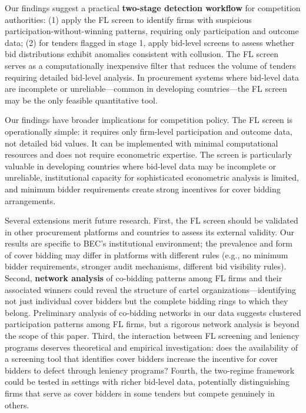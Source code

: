 Our findings suggest a practical \textbf{two-stage detection workflow} for competition authorities: (1) apply the FL screen to identify firms with suspicious participation-without-winning patterns, requiring only participation and outcome data; (2) for tenders flagged in stage 1, apply bid-level screens \citep{imhof2019detecting, chassang2022robust} to assess whether bid distributions exhibit anomalies consistent with collusion. The FL screen serves as a computationally inexpensive filter that reduces the volume of tenders requiring detailed bid-level analysis. In procurement systems where bid-level data are incomplete or unreliable---common in developing countries---the FL screen may be the only feasible quantitative tool.

Our findings have broader implications for competition policy. The FL screen is operationally simple: it requires only firm-level participation and outcome data, not detailed bid values. It can be implemented with minimal computational resources and does not require econometric expertise. The screen is particularly valuable in developing countries where bid-level data may be incomplete or unreliable, institutional capacity for sophisticated econometric analysis is limited, and minimum bidder requirements create strong incentives for cover bidding arrangements.

Several extensions merit future research. First, the FL screen should be validated in other procurement platforms and countries to assess its external validity. Our results are specific to BEC's institutional environment; the prevalence and form of cover bidding may differ in platforms with different rules (e.g., no minimum bidder requirements, stronger audit mechanisms, different bid visibility rules). Second, \textbf{network analysis} of co-bidding patterns among FL firms and their associated winners could reveal the structure of cartel organizations---identifying not just individual cover bidders but the complete bidding rings to which they belong. Preliminary analysis of co-bidding networks in our data suggests clustered participation patterns among FL firms, but a rigorous network analysis is beyond the scope of this paper. Third, the interaction between FL screening and leniency programs deserves theoretical and empirical investigation: does the availability of a screening tool that identifies cover bidders increase the incentive for cover bidders to defect through leniency programs? Fourth, the two-regime framework could be tested in settings with richer bid-level data, potentially distinguishing firms that serve as cover bidders in some tenders but compete genuinely in others.
